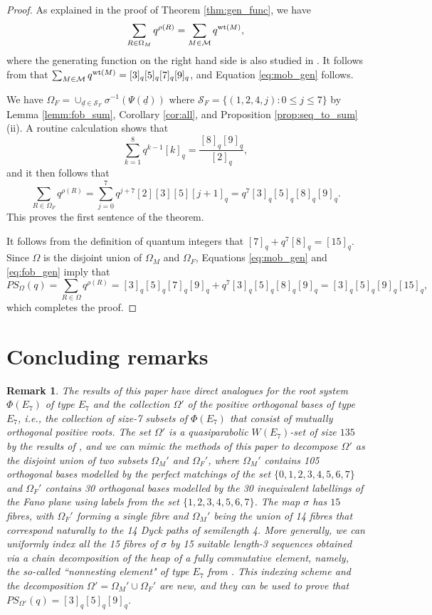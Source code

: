 \documentclass[10pt,a4paper]{amsart}
\newtheorem{rmk}[theorem]{Remark}
\numberwithin{equation}{section}
\newcommand{\seqd}{\underline{d}}
\newcommand{\calm}{\mathcal{M}}
\newcommand{\cals}{\mathcal{S}}
\newcommand{\ob}{\Omega}
\newcommand{\fob}{\Omega_F}
\newcommand{\mob}{\Omega_M}
\DeclareMathOperator{\wt}{\rm{wt}}
\newcommand{\inverse}{^{-1}}
\begin{document}
\begin{proof}
  As explained in the proof of Theorem \ref{thm:gen_func}, we have  
  \[
    \sum_{R\in \mob}q^{\rho(R)} = \sum_{M\in \calm}q^{\wt(M)}, 
  \]
  where the generating function on the right hand side is also studied in
  \cite{watson14}. It follows from \cite[Theorem 1]{watson14} that $\sum_{M\in
  \calm}q^{\wt(M)}=[3]_q[5]_q[7]_q[9]_q$, and Equation \eqref{eq:mob_gen}
  follows. 
 
  We have $\fob=\cup_{\seqd\in \cals_F} \sigma\inverse(\Psi(\seqd))$ where
  $\cals_F=\{(1,2,4,j): 0\le j \le 7\}$  by Lemma
  \ref{lemm:fob_sum}, Corollary \ref{cor:all}, and Proposition
  \ref{prop:seq_to_sum} (ii). A routine calculation shows that 
  \[
  \sum_{k=1}^8 q^{k-1}[k]_q = \frac{[8]_q[9]_q}{[2]_q}, 
  \]
and it then follows that
\[
\sum_{R\in \fob}q^{\rho(R)} = \sum_{j=0}^7
q^{j+7}[2][3][5][j+1]_q=q^7[3]_q[5]_q[8]_q[9]_q.
\]
This proves the first sentence of the theorem.

  It follows from the definition of quantum integers that
  $[7]_q+q^7[8]_q=[15]_q$. Since $\ob$ is the disjoint union of $\mob$ and
  $\fob$, Equations \eqref{eq:mob_gen} and \eqref{eq:fob_gen} imply that
  \[
    PS_\ob(q)=\sum_{R\in\ob}q^{\rho(R)}
    =[3]_q[5]_q[7]_q[9]_q
    + q^7[3]_q[5]_q[8]_q[9]_q=[3]_q[5]_q[9]_q[15]_q,
  \]
  which completes the proof.
\end{proof}


\section{Concluding remarks}
\label{sec:conclude}


\begin{rmk}\label{rmk:e7}
The results of this paper have direct analogues for the root system
$\Phi(E_7)$ of type $E_7$ and the collection $\ob'$ of the positive orthogonal
bases of type $E_7$, i.e., the collection of size-7 subsets of $\Phi(E_7)$ that
consist of
mutually orthogonal positive roots. The set $\ob'$ is a quasiparabolic
$W(E_7)$-set of size $135$ by the results of \cite{gx5,gx6}, and we can mimic
the methods of this paper to decompose $\ob'$ as the disjoint union of two
subsets $\mob'$ and $\fob'$, where $\mob'$ contains 105 orthogonal bases modelled by the perfect
matchings of the set $\{0,1,2,3,4,5,6,7\}$ and $\fob'$ contains 30
orthogonal bases modelled by the 30 inequivalent labellings of the Fano plane using
labels from the set $\{1,2,3,4,5,6,7\}$. The map $\sigma$ has $15$ fibres, 
with $\fob'$ forming a single fibre and 
$\mob'$ being the union of 14 fibres that correspond naturally to the 14 Dyck
paths of semilength 4. More generally, we can uniformly index all the 15 fibres
of $\sigma$ by 15 suitable length-3 sequences
obtained via a chain decomposition of the heap of a fully commutative
element, namely, the so-called ``nonnesting element" of type $E_7$ from
\cite[Section 6.2]{gx5}. This indexing scheme and the 
decomposition $\ob'=\mob'\cup \fob'$ are new, and they can be used to prove that
$PS_{\ob'}(q)=[3]_q [5]_q [9]_q$.
\end{rmk}
\end{document}
